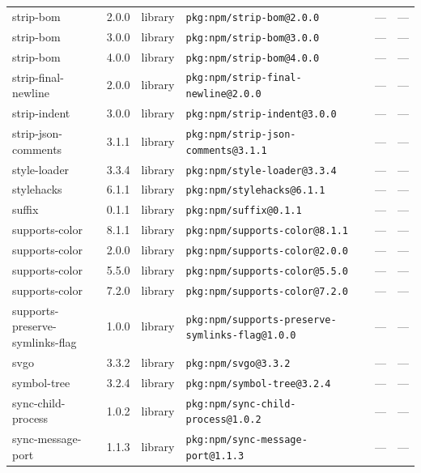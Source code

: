 \documentclass[11pt,a4paper]{article}
\begin{document}
\begin{longtable}{|p{4cm}|p{2cm}|p{1.6cm}|p{5cm}|p{1.5cm}|p{3.5cm}|}
\raggedright strip-bom & 2.0.0 & library & \small\texttt{pkg:npm/strip-bom@2.0.0} & — & \small — \\
\raggedright strip-bom & 3.0.0 & library & \small\texttt{pkg:npm/strip-bom@3.0.0} & — & \small — \\
\raggedright strip-bom & 4.0.0 & library & \small\texttt{pkg:npm/strip-bom@4.0.0} & — & \small — \\
\raggedright strip-final-newline & 2.0.0 & library & \small\texttt{pkg:npm/strip-final-newline@2.0.0} & — & \small — \\
\raggedright strip-indent & 3.0.0 & library & \small\texttt{pkg:npm/strip-indent@3.0.0} & — & \small — \\
\raggedright strip-json-comments & 3.1.1 & library & \small\texttt{pkg:npm/strip-json-comments@3.1.1} & — & \small — \\
\raggedright style-loader & 3.3.4 & library & \small\texttt{pkg:npm/style-loader@3.3.4} & — & \small — \\
\raggedright stylehacks & 6.1.1 & library & \small\texttt{pkg:npm/stylehacks@6.1.1} & — & \small — \\
\raggedright suffix & 0.1.1 & library & \small\texttt{pkg:npm/suffix@0.1.1} & — & \small — \\
\raggedright supports-color & 8.1.1 & library & \small\texttt{pkg:npm/supports-color@8.1.1} & — & \small — \\
\raggedright supports-color & 2.0.0 & library & \small\texttt{pkg:npm/supports-color@2.0.0} & — & \small — \\
\raggedright supports-color & 5.5.0 & library & \small\texttt{pkg:npm/supports-color@5.5.0} & — & \small — \\
\raggedright supports-color & 7.2.0 & library & \small\texttt{pkg:npm/supports-color@7.2.0} & — & \small — \\
\raggedright supports-preserve-symlinks-flag & 1.0.0 & library & \small\texttt{pkg:npm/supports-preserve-symlinks-flag@1.0.0} & — & \small — \\
\raggedright svgo & 3.3.2 & library & \small\texttt{pkg:npm/svgo@3.3.2} & — & \small — \\
\raggedright symbol-tree & 3.2.4 & library & \small\texttt{pkg:npm/symbol-tree@3.2.4} & — & \small — \\
\raggedright sync-child-process & 1.0.2 & library & \small\texttt{pkg:npm/sync-child-process@1.0.2} & — & \small — \\
\raggedright sync-message-port & 1.1.3 & library & \small\texttt{pkg:npm/sync-message-port@1.1.3} & — & \small — \\

\end{longtable}
\end{document}
